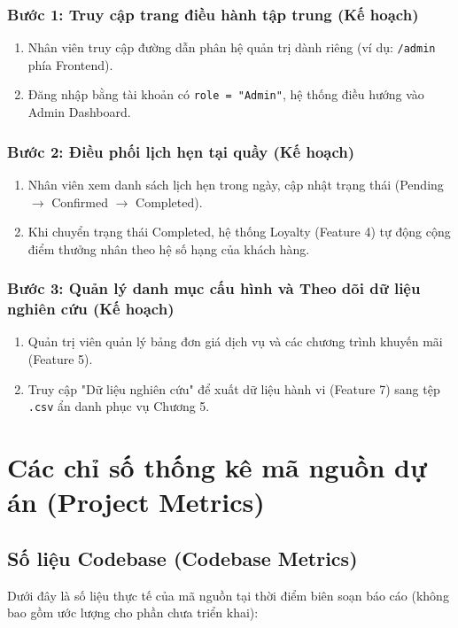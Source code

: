 \subsubsection{Bước 1: Truy cập trang điều hành tập trung (Kế hoạch)}
\begin{enumerate}
    \item Nhân viên truy cập đường dẫn phân hệ quản trị dành riêng (ví dụ: \texttt{/admin} phía Frontend).
    \item Đăng nhập bằng tài khoản có \texttt{role = "Admin"}, hệ thống điều hướng vào Admin Dashboard.
\end{enumerate}

\subsubsection{Bước 2: Điều phối lịch hẹn tại quầy (Kế hoạch)}
\begin{enumerate}
    \item Nhân viên xem danh sách lịch hẹn trong ngày, cập nhật trạng thái (Pending $\rightarrow$ Confirmed $\rightarrow$ Completed).
    \item Khi chuyển trạng thái Completed, hệ thống Loyalty (Feature 4) tự động cộng điểm thưởng nhân theo hệ số hạng của khách hàng.
\end{enumerate}

\subsubsection{Bước 3: Quản lý danh mục cấu hình và Theo dõi dữ liệu nghiên cứu (Kế hoạch)}
\begin{enumerate}
    \item Quản trị viên quản lý bảng đơn giá dịch vụ và các chương trình khuyến mãi (Feature 5).
    \item Truy cập "Dữ liệu nghiên cứu" để xuất dữ liệu hành vi (Feature 7) sang tệp \texttt{.csv} ẩn danh phục vụ Chương 5.
\end{enumerate}

\section{Các chỉ số thống kê mã nguồn dự án (Project Metrics)}

\subsection{Số liệu Codebase (Codebase Metrics)}
Dưới đây là số liệu thực tế của mã nguồn tại thời điểm biên soạn báo cáo (không bao gồm ước lượng cho phần chưa triển khai):


